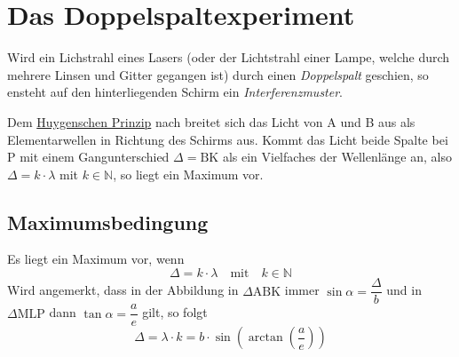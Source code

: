 \documentclass{article}
\begin{document}
\section{Das Doppelspaltexperiment} 
Wird ein Lichstrahl eines Lasers (oder der Lichtstrahl einer Lampe, welche durch mehrere Linsen und Gitter gegangen ist) durch einen \emph{Doppelspalt} geschien, so ensteht auf den hinterliegenden Schirm ein \emph{Interferenzmuster}. 
 
\noindent \begin{minipage}{\dimexpr\linewidth-8cm}
 Dem \hyperref[Ausbreitung]{Huygenschen Prinzip} nach breitet sich das Licht von A und B aus als Elementarwellen in Richtung des Schirms aus. Kommt das Licht beide Spalte bei P mit einem Gangunterschied $\Delta = \text{BK}$ als ein Vielfaches der Wellenlänge an, also $\Delta = k \cdot \lambda$ mit $k \in \mathbb{N}$, so liegt ein Maximum vor.
\end{minipage} 
\hfill 
\begin{minipage}{7.5cm}
 \center
\end{minipage} 
\subsection{Maximumsbedingung}
Es liegt ein Maximum vor, wenn
\[
 \Delta = k \cdot \lambda
 \quad \text{mit} \quad
 k \in \mathbb{N}
\] 
Wird angemerkt, dass in der Abbildung in $\Delta \text{ABK}$ immer $\sin\alpha = \dfrac{\Delta}{b}$ und in $\Delta \text{MLP}$ dann ${\tan\alpha = \dfrac{a}{e}}$ gilt, so folgt
\[
 \Delta = \lambda \cdot k = b \cdot \sin{\left(\arctan{\left(\frac{a}{e}\right)}\right)} 
\]
\end{document}
